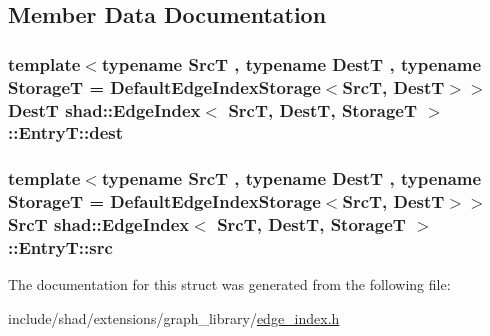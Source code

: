 \subsection{Member Data Documentation}
\hypertarget{structshad_1_1EdgeIndex_1_1EntryT_a538cbbeef35115be233a1f5a4d700c93}{
\subsubsection[{dest}]{\setlength{\rightskip}{0pt plus 5cm}template$<$typename Src\-T , typename Dest\-T , typename Storage\-T  = Default\-Edge\-Index\-Storage$<$\-Src\-T, Dest\-T$>$$>$ Dest\-T {\bf shad\-::\-Edge\-Index}$<$ Src\-T, Dest\-T, Storage\-T $>$\-::Entry\-T\-::dest}}\label{structshad_1_1EdgeIndex_1_1EntryT_a538cbbeef35115be233a1f5a4d700c93}
\hypertarget{structshad_1_1EdgeIndex_1_1EntryT_a9437ab5481f5db7a277d9c26ecfe1b70}{
\subsubsection[{src}]{\setlength{\rightskip}{0pt plus 5cm}template$<$typename Src\-T , typename Dest\-T , typename Storage\-T  = Default\-Edge\-Index\-Storage$<$\-Src\-T, Dest\-T$>$$>$ Src\-T {\bf shad\-::\-Edge\-Index}$<$ Src\-T, Dest\-T, Storage\-T $>$\-::Entry\-T\-::src}}\label{structshad_1_1EdgeIndex_1_1EntryT_a9437ab5481f5db7a277d9c26ecfe1b70}


The documentation for this struct was generated from the following file\-:\begin{DoxyCompactItemize}
\item 
include/shad/extensions/graph\-\_\-library/\hyperlink{edge__index_8h}{edge\-\_\-index.\-h}\end{DoxyCompactItemize}
